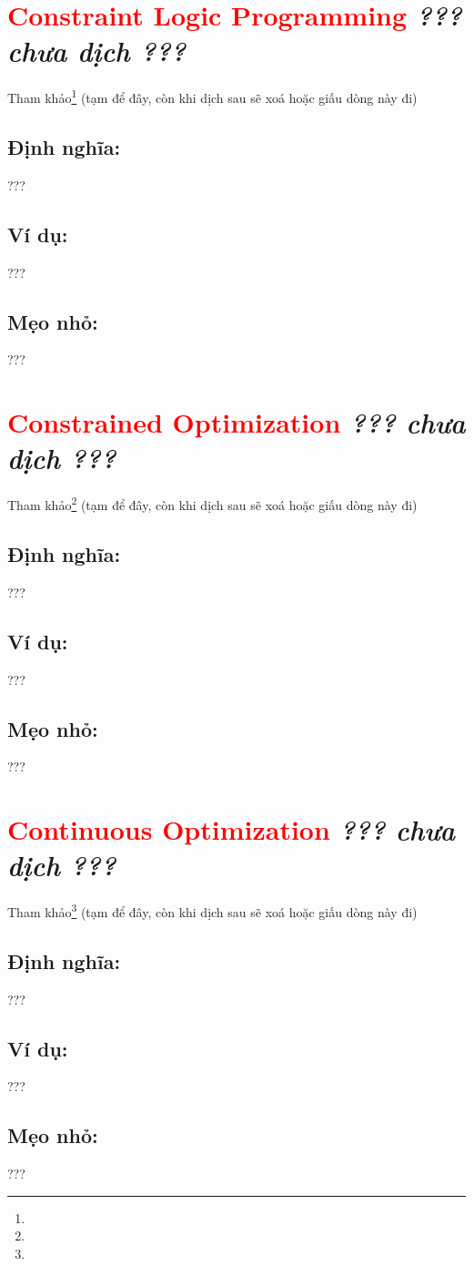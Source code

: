 \section*{\huge \textcolor{Red}{Constraint Logic Programming}  \small \textit{??? chưa dịch ???} }
Tham khảo\footnote{} (tạm để đây, còn khi dịch sau sẽ xoá hoặc giấu dòng này đi)
\subsection*{Định nghĩa:}
???
\subsection*{Ví dụ:}
???
\subsection*{Mẹo nhỏ:}
???
\section*{\huge \textcolor{Red}{Constrained Optimization}  \small \textit{??? chưa dịch ???} }
Tham khảo\footnote{} (tạm để đây, còn khi dịch sau sẽ xoá hoặc giấu dòng này đi)
\subsection*{Định nghĩa:}
???
\subsection*{Ví dụ:}
???
\subsection*{Mẹo nhỏ:}
???
\section*{\huge \textcolor{Red}{Continuous Optimization}  \small \textit{??? chưa dịch ???} }
Tham khảo\footnote{} (tạm để đây, còn khi dịch sau sẽ xoá hoặc giấu dòng này đi)
\subsection*{Định nghĩa:}
???
\subsection*{Ví dụ:}
???
\subsection*{Mẹo nhỏ:}
???
